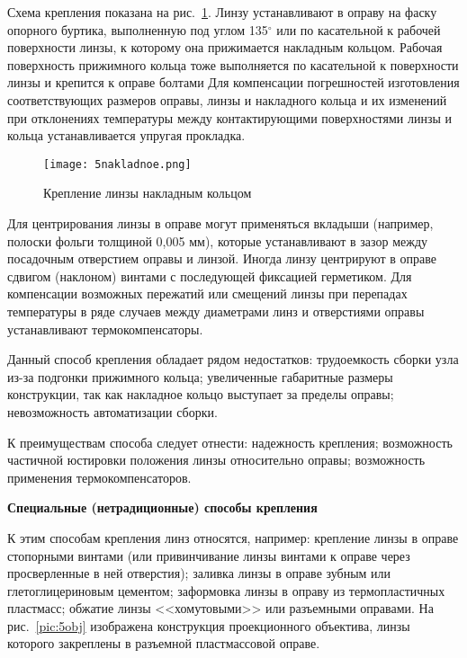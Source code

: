 Схема крепления показана на рис.~\ref{pic:5nakladnoe}. Линзу устанавливают в оправу на фаску опорного буртика, выполненную под углом 135$^\circ$ или по касательной к рабочей поверхности линзы, к которому она прижимается накладным кольцом. Рабочая поверхность прижимного кольца тоже выполняется по касательной к поверхности линзы и крепится к оправе болтами Для компенсации погрешностей изготовления соответствующих размеров оправы, линзы и накладного кольца и их изменений при отклонениях температуры между контактирующими поверхностями линзы и кольца устанавливается упругая прокладка.

\begin{figure}[h!]
	\caption{ Крепление линзы накладным кольцом }
	\texttt{[image: 5nakladnoe.png]}
	\label{pic:5nakladnoe}
\end{figure}
 
Для центрирования линзы в оправе могут применяться вкладыши (например, полоски фольги толщиной 0,005 мм), которые устанавливают в зазор между посадочным отверстием оправы и линзой. Иногда линзу центрируют в оправе сдвигом (наклоном) винтами с последующей фиксацией герметиком.
Для компенсации возможных пережатий или смещений линзы при перепадах температуры в ряде случаев между диаметрами линз и отверстиями оправы устанавливают термокомпенсаторы.

Данный способ крепления обладает рядом недостатков: трудоемкость сборки узла из-за подгонки прижимного кольца; увеличенные габаритные размеры конструкции, так как накладное кольцо выступает за пределы оправы; невозможность автоматизации сборки.

К преимуществам способа следует отнести: надежность крепления; возможность частичной юстировки положения линзы относительно оправы; возможность применения термокомпенсаторов.

\begin{flushleft}
	\textbf{Специальные (нетрадиционные) способы крепления}
\end{flushleft}

К этим способам крепления линз относятся, например: крепление линзы в оправе стопорными винтами (или привинчивание линзы винтами к оправе через просверленные в ней отверстия); заливка линзы в оправе зубным или глетоглицериновым цементом; заформовка линзы в оправу из термопластичных пластмасс; обжатие линзы <<хомутовыми>> или разъемными оправами. На рис.~\ref{pic:5obj} изображена конструкция проекционного объектива, линзы которого закреплены в разъемной пластмассовой оправе.

